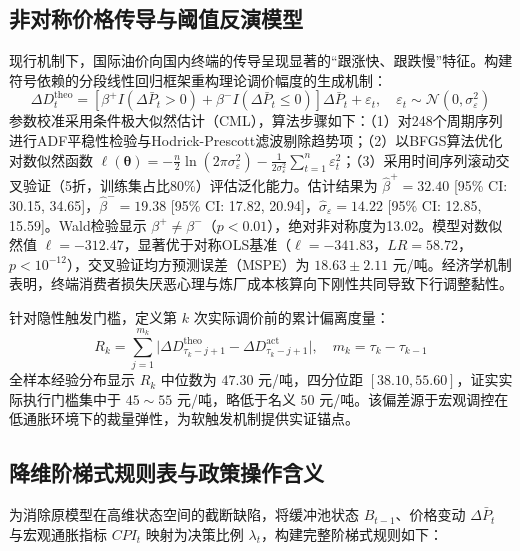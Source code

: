 \documentclass{mcmthesis}
\begin{document}
\subsection{ 非对称价格传导与阈值反演模型}
现行机制下，国际油价向国内终端的传导呈现显著的“跟涨快、跟跌慢”特征。构建符号依赖的分段线性回归框架重构理论调价幅度的生成机制：
$$
\Delta D_t^{\text{theo}} = \left[\beta^{+}I(\Delta\bar{P}_t>0)+\beta^{-}I(\Delta\bar{P}_t\leq 0)\right]\Delta\bar{P}_t+\varepsilon_t,\quad \varepsilon_t\sim\mathcal{N}(0,\sigma_\varepsilon^2) \tag{1}
$$
参数校准采用条件极大似然估计（CML），算法步骤如下：（1）对248个周期序列进行ADF平稳性检验与Hodrick-Prescott滤波剔除趋势项；（2）以BFGS算法优化对数似然函数 $\ell(\boldsymbol{\theta}) = -\frac{n}{2}\ln(2\pi\sigma_\varepsilon^2) - \frac{1}{2\sigma_\varepsilon^2}\sum_{t=1}^n \varepsilon_t^2$；（3）采用时间序列滚动交叉验证（5折，训练集占比80\%）评估泛化能力。估计结果为 $\hat{\beta}^{+}=32.40$ [95\% CI: 30.15, 34.65]，$\hat{\beta}^{-}=19.38$ [95\% CI: 17.82, 20.94]，$\hat{\sigma}_\varepsilon=14.22$ [95\% CI: 12.85, 15.59]。Wald检验显示 $\beta^+ \neq \beta^-$（$p<0.01$），绝对非对称度为13.02。模型对数似然值 $\ell=-312.47$，显著优于对称OLS基准（$\ell=-341.83$，$LR=58.72$，$p<10^{-12}$），交叉验证均方预测误差（MSPE）为 $18.63 \pm 2.11$ 元/吨。经济学机制表明，终端消费者损失厌恶心理与炼厂成本核算向下刚性共同导致下行调整黏性。

针对隐性触发门槛，定义第 $k$ 次实际调价前的累计偏离度量：
$$
R_{k}=\sum_{j=1}^{m_k}\big|\Delta D_{\tau_k-j+1}^{\text{theo}}-\Delta D_{\tau_k-j+1}^{\text{act}}\big|,\quad m_k=\tau_k-\tau_{k-1} \tag{2}
$$
全样本经验分布显示 $R_k$ 中位数为 $47.30$ 元/吨，四分位距 $[38.10, 55.60]$，证实实际执行门槛集中于 $45\sim55$ 元/吨，略低于名义 $50$ 元/吨。该偏差源于宏观调控在低通胀环境下的裁量弹性，为软触发机制提供实证锚点。

\subsection{ 降维阶梯式规则表与政策操作含义}
为消除原模型在高维状态空间的截断缺陷，将缓冲池状态 $B_{t-1}$、价格变动 $\Delta \bar{P}_t$ 与宏观通胀指标 $CPI_t$ 映射为决策比例 $\lambda_t$，构建完整阶梯式规则如下：
\end{document}
